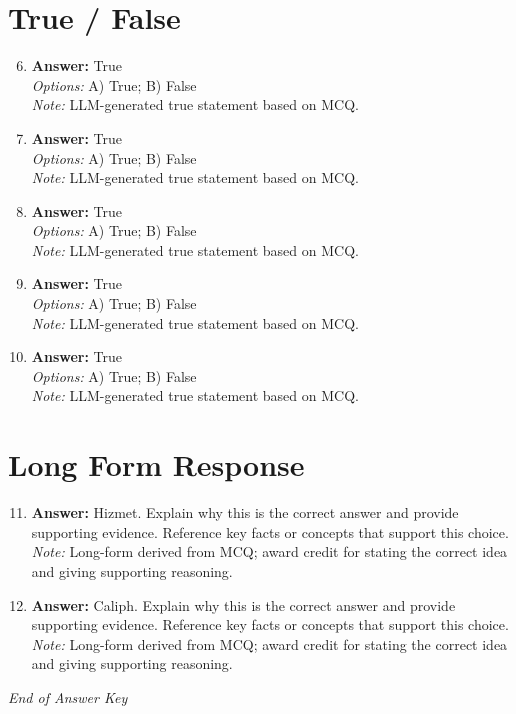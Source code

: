 \documentclass[12pt]{article}
\begin{document}
\section*{True / False}
\begin{enumerate}[label=\arabic*.]
\setcounter{enumi}{5}
\item \textbf{Answer:} True
\\ \textit{Options:} A) True; B) False
\\ \textit{Note:} LLM-generated true statement based on MCQ.
\item \textbf{Answer:} True
\\ \textit{Options:} A) True; B) False
\\ \textit{Note:} LLM-generated true statement based on MCQ.
\item \textbf{Answer:} True
\\ \textit{Options:} A) True; B) False
\\ \textit{Note:} LLM-generated true statement based on MCQ.
\item \textbf{Answer:} True
\\ \textit{Options:} A) True; B) False
\\ \textit{Note:} LLM-generated true statement based on MCQ.
\item \textbf{Answer:} True
\\ \textit{Options:} A) True; B) False
\\ \textit{Note:} LLM-generated true statement based on MCQ.
\end{enumerate}

\section*{Long Form Response}
\begin{enumerate}[label=\arabic*.]
\setcounter{enumi}{10}
\item \textbf{Answer:} Hizmet. Explain why this is the correct answer and provide supporting evidence. Reference key facts or concepts that support this choice.
\\ \textit{Note:} Long-form derived from MCQ; award credit for stating the correct idea and giving supporting reasoning.
\item \textbf{Answer:} Caliph. Explain why this is the correct answer and provide supporting evidence. Reference key facts or concepts that support this choice.
\\ \textit{Note:} Long-form derived from MCQ; award credit for stating the correct idea and giving supporting reasoning.
\end{enumerate}

\vfill
\noindent\textit{End of Answer Key}
\end{document}
